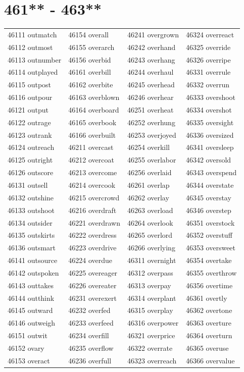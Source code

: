 \documentclass[10pt, oneside]{book}
\begin{document}
\begin{table}
	\centering
	\section*{461** - 463**}
	\begin{tabular}{l l l l}
46111 outmatch &46154 overall &46241 overgrown &46324 overreact\\
46112 outmost &46155 overarch &46242 overhand &46325 override\\
46113 outnumber &46156 overbid &46243 overhang &46326 overripe\\
46114 outplayed &46161 overbill &46244 overhaul &46331 overrule\\
46115 outpost &46162 overbite &46245 overhead &46332 overrun\\
46116 outpour &46163 overblown &46246 overhear &46333 overshoot\\
46121 output &46164 overboard &46251 overheat &46334 overshot\\
46122 outrage &46165 overbook &46252 overhung &46335 oversight\\
46123 outrank &46166 overbuilt &46253 overjoyed &46336 oversized\\
46124 outreach &46211 overcast &46254 overkill &46341 oversleep\\
46125 outright &46212 overcoat &46255 overlabor &46342 oversold\\
46126 outscore &46213 overcome &46256 overlaid &46343 overspend\\
46131 outsell &46214 overcook &46261 overlap &46344 overstate\\
46132 outshine &46215 overcrowd &46262 overlay &46345 overstay\\
46133 outshoot &46216 overdraft &46263 overload &46346 overstep\\
46134 outsider &46221 overdrawn &46264 overlook &46351 overstock\\
46135 outskirts &46222 overdress &46265 overlord &46352 overstuff\\
46136 outsmart &46223 overdrive &46266 overlying &46353 oversweet\\
46141 outsource &46224 overdue &46311 overnight &46354 overtake\\
46142 outspoken &46225 overeager &46312 overpass &46355 overthrow\\
46143 outtakes &46226 overeater &46313 overpay &46356 overtime\\
46144 outthink &46231 overexert &46314 overplant &46361 overtly\\
46145 outward &46232 overfed &46315 overplay &46362 overtone\\
46146 outweigh &46233 overfeed &46316 overpower &46363 overture\\
46151 outwit &46234 overfill &46321 overprice &46364 overturn\\
46152 ovary &46235 overflow &46322 overrate &46365 overuse\\
46153 overact &46236 overfull &46323 overreach &46366 overvalue\\
	\end{tabular}
 \end{table}
\clearpage
\end{document}
